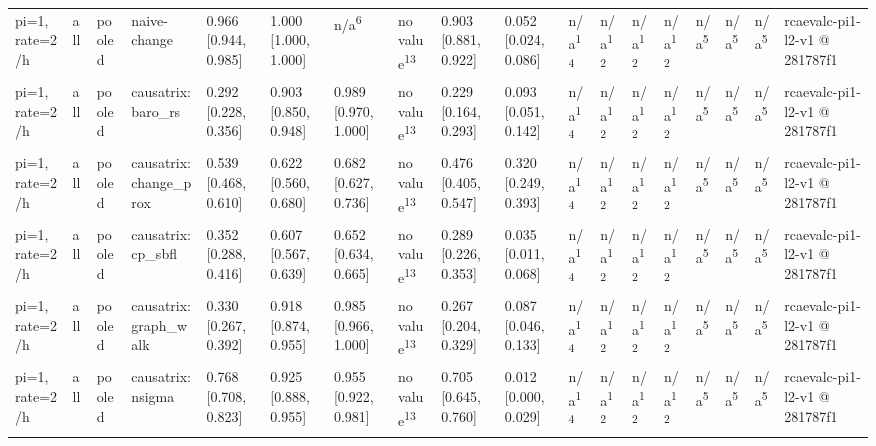 \begin{table}[t]
\begin{tabular}{llllllllllllllllll}
pi=1, rate=2/h & all & pooled & naive-change & 0.966 [0.944, 0.985] & 1.000 [1.000, 1.000] & n/a\textsuperscript{6} & no value\textsuperscript{13} & 0.903 [0.881, 0.922] & 0.052 [0.024, 0.086] & n/a\textsuperscript{14} & n/a\textsuperscript{12} & n/a\textsuperscript{12} & n/a\textsuperscript{12} & n/a\textsuperscript{5} & n/a\textsuperscript{5} & n/a\textsuperscript{5} & rcaevalc-pi1-l2-v1 @ 281787f1 \\
pi=1, rate=2/h & all & pooled & causatrix:baro\_rs & 0.292 [0.228, 0.356] & 0.903 [0.850, 0.948] & 0.989 [0.970, 1.000] & no value\textsuperscript{13} & 0.229 [0.164, 0.293] & 0.093 [0.051, 0.142] & n/a\textsuperscript{14} & n/a\textsuperscript{12} & n/a\textsuperscript{12} & n/a\textsuperscript{12} & n/a\textsuperscript{5} & n/a\textsuperscript{5} & n/a\textsuperscript{5} & rcaevalc-pi1-l2-v1 @ 281787f1 \\
pi=1, rate=2/h & all & pooled & causatrix:change\_prox & 0.539 [0.468, 0.610] & 0.622 [0.560, 0.680] & 0.682 [0.627, 0.736] & no value\textsuperscript{13} & 0.476 [0.405, 0.547] & 0.320 [0.249, 0.393] & n/a\textsuperscript{14} & n/a\textsuperscript{12} & n/a\textsuperscript{12} & n/a\textsuperscript{12} & n/a\textsuperscript{5} & n/a\textsuperscript{5} & n/a\textsuperscript{5} & rcaevalc-pi1-l2-v1 @ 281787f1 \\
pi=1, rate=2/h & all & pooled & causatrix:cp\_sbfl & 0.352 [0.288, 0.416] & 0.607 [0.567, 0.639] & 0.652 [0.634, 0.665] & no value\textsuperscript{13} & 0.289 [0.226, 0.353] & 0.035 [0.011, 0.068] & n/a\textsuperscript{14} & n/a\textsuperscript{12} & n/a\textsuperscript{12} & n/a\textsuperscript{12} & n/a\textsuperscript{5} & n/a\textsuperscript{5} & n/a\textsuperscript{5} & rcaevalc-pi1-l2-v1 @ 281787f1 \\
pi=1, rate=2/h & all & pooled & causatrix:graph\_walk & 0.330 [0.267, 0.392] & 0.918 [0.874, 0.955] & 0.985 [0.966, 1.000] & no value\textsuperscript{13} & 0.267 [0.204, 0.329] & 0.087 [0.046, 0.133] & n/a\textsuperscript{14} & n/a\textsuperscript{12} & n/a\textsuperscript{12} & n/a\textsuperscript{12} & n/a\textsuperscript{5} & n/a\textsuperscript{5} & n/a\textsuperscript{5} & rcaevalc-pi1-l2-v1 @ 281787f1 \\
pi=1, rate=2/h & all & pooled & causatrix:nsigma & 0.768 [0.708, 0.823] & 0.925 [0.888, 0.955] & 0.955 [0.922, 0.981] & no value\textsuperscript{13} & 0.705 [0.645, 0.760] & 0.012 [0.000, 0.029] & n/a\textsuperscript{14} & n/a\textsuperscript{12} & n/a\textsuperscript{12} & n/a\textsuperscript{12} & n/a\textsuperscript{5} & n/a\textsuperscript{5} & n/a\textsuperscript{5} & rcaevalc-pi1-l2-v1 @ 281787f1 \\

\end{tabular}
\end{table}
